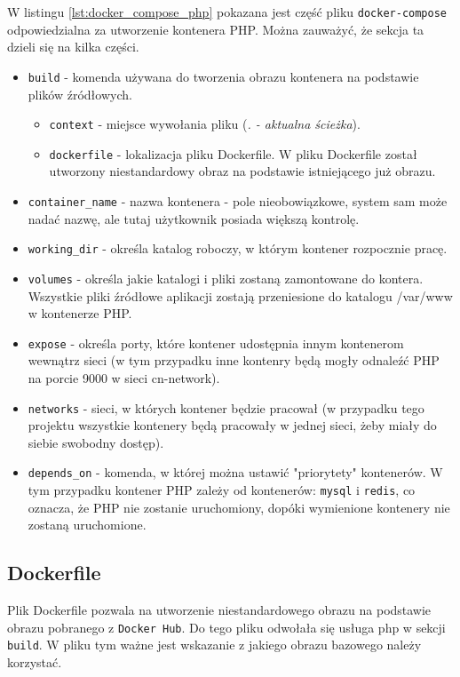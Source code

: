 W listingu \ref{lst:docker_compose_php} pokazana jest część pliku \verb|docker-compose| odpowiedzialna za utworzenie kontenera PHP. Można zauważyć, że sekcja ta dzieli się na kilka części.
\begin{itemize}
    \item \verb|build| - komenda używana do tworzenia obrazu kontenera na podstawie plików źródłowych.
    \begin{itemize}
        \item \verb|context| - miejsce wywołania pliku (\textit{. - aktualna ścieżka}).
        \item \verb|dockerfile| - lokalizacja pliku Dockerfile. W pliku Dockerfile został utworzony niestandardowy obraz na podstawie istniejącego już obrazu.
    \end{itemize}
    \item \verb|container_name| - nazwa kontenera - pole nieobowiązkowe, system sam może nadać nazwę, ale tutaj użytkownik posiada większą kontrolę.
    \item \verb|working_dir| - określa katalog roboczy, w którym kontener rozpocznie pracę.
    \item \verb|volumes| - określa jakie katalogi i pliki zostaną zamontowane do kontera. Wszystkie pliki źródłowe aplikacji zostają przeniesione do katalogu /var/www w kontenerze PHP.
    \item \verb|expose| - określa porty, które kontener udostępnia innym kontenerom wewnątrz sieci (w tym przypadku inne kontenry będą mogły odnaleźć PHP na porcie 9000 w sieci cn-network).
    \item \verb|networks| - sieci, w których kontener będzie pracował (w przypadku tego projektu wszystkie kontenery będą pracowały w jednej sieci, żeby miały do siebie swobodny dostęp).
    \item \verb|depends_on| - komenda, w której można ustawić "priorytety" kontenerów. W tym przypadku kontener PHP zależy od kontenerów: \verb|mysql| i \verb|redis|, co oznacza, że PHP nie zostanie uruchomiony, dopóki wymienione kontenery nie zostaną uruchomione.
\end{itemize}

\subsection{Dockerfile}
Plik Dockerfile pozwala na utworzenie niestandardowego obrazu na podstawie obrazu pobranego z \verb|Docker Hub|. Do tego pliku odwołała się usługa php w sekcji \verb|build|. W pliku tym ważne jest wskazanie z jakiego obrazu bazowego należy korzystać.

